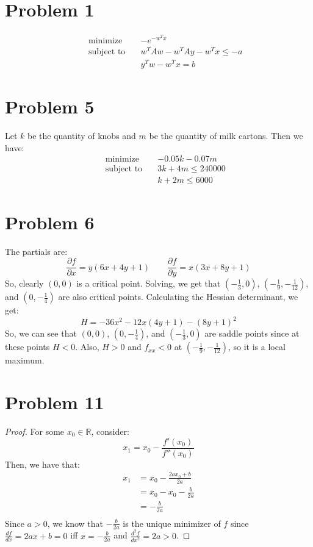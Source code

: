 \documentclass{article}
\begin{document}
\section*{Problem 1}

\begin{align*}
&&\text{minimize} \quad &-e^{-w^{T}x} \\
&&\text{subject to} \quad &w^{T}Aw - w^{T}Ay - w^{T}x \leq -a \\
&& &y^{T}w - w^{T}x = b
\end{align*}


\section*{Problem 5}
Let $k$ be the quantity of knobs and $m$ be the quantity of milk cartons. Then we have:
\begin{align*}
&&\text{minimize} \quad &-0.05k - 0.07m \\
&&\text{subject to} \quad &3k + 4m \leq 240000 \\
&& &k + 2m \leq 6000
\end{align*}


\section*{Problem 6}
The partials are:
$$\frac{\partial f}{\partial x} = y(6x + 4y + 1) \qquad \frac{\partial f}{\partial y} = x(3x + 8y + 1)$$
So, clearly $(0, 0)$ is a critical point. Solving, we get that $(-\frac{1}{3}, 0)$, $(-\frac{1}{9}, -\frac{1}{12})$, and $(0, -\frac{1}{4})$ are also critical points.
Calculating the Hessian determinant, we get:
$$H = -36x^2 - 12x(4y + 1) - (8y + 1)^2$$
So, we can see that $(0, 0)$, $(0, -\frac{1}{4})$, and $(-\frac{1}{3}, 0)$ are saddle points since at these points $H < 0$. Also, $H > 0$ and $f_{xx} < 0$ at $(-\frac{1}{9}, -\frac{1}{12})$, so it is a local maximum.

\section*{Problem 11}

\begin{proof}
For some $x_0 \in \mathbb{R}$, consider:
$$x_1 = x_0 - \frac{f'(x_0)}{f''(x_0)}$$
Then, we have that:
\begin{align*}
x_1 &= x_0 - \frac{2ax_0 + b}{2a} \\
&= x_0 - x_0 - \frac{b}{2a} \\
&= -\frac{b}{2a} \\
\end{align*}
Since $a > 0$, we know that $-\frac{b}{2a}$ is the unique minimizer of $f$ since $\frac{df}{dx} = 2ax + b = 0$ iff $x = -\frac{b}{2a}$ and $\frac{d^{2}f}{dx^2} = 2a > 0$.
\end{proof}
\end{document}
